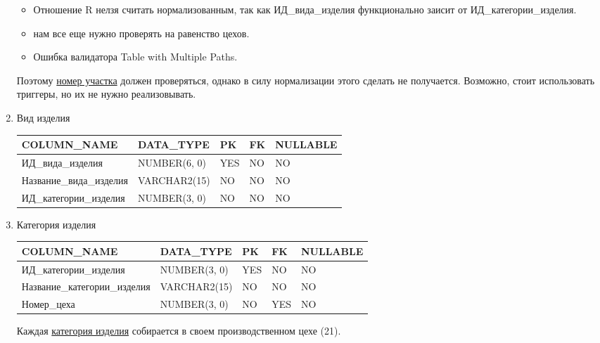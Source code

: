 \begin{enumerate}
    \begin{itemize}

        \item Отношение R нелзя считать нормализованным, так как ИД\_вида\_изделия функционально заисит от ИД\_категории\_изделия.
        \item нам все еще нужно проверять на равенство цехов.
        \item Ошибка валидатора Table with Multiple Paths.

    \end{itemize}

    Поэтому \underline{номер участка} должен проверяться, однако в силу нормализации этого сделать не получается.
    Возможно, стоит использовать триггеры, но их не нужно реализовывать.

    \item{Вид изделия}

    \begin{tabular}{|p{4cm}|p{3cm}|p{1cm}|p{1cm}|p{2cm}|} \hline

        {\bf COLUMN\_NAME} & {\bf DATA\_TYPE} & {\bf PK} & {\bf FK} & {\bf NULLABLE} \\ \hline
        ИД\_вида\_изделия & NUMBER(6, 0) & YES & NO & NO \\ \hline
        Название\_вида\_изделия & VARCHAR2(15) & NO & NO & NO \\ \hline
        ИД\_категории\_изделия & NUMBER(3, 0) & NO & NO & NO \\ \hline

    \end{tabular}

    \item{Категория изделия}

    \begin{tabular}{|p{4cm}|p{3cm}|p{1cm}|p{1cm}|p{2cm}|} \hline

        {\bf COLUMN\_NAME} & {\bf DATA\_TYPE} & {\bf PK} & {\bf FK} & {\bf NULLABLE} \\ \hline
        ИД\_категории\_изделия & NUMBER(3, 0) & YES & NO & NO \\ \hline
        Название\_категории\_изделия & VARCHAR2(15) & NO & NO & NO \\ \hline
        Номер\_цеха & NUMBER(3, 0) & NO & YES & NO \\ \hline

    \end{tabular}

    Каждая \underline{категория изделия} собирается в своем производственном цехе (21).


\end{enumerate}
